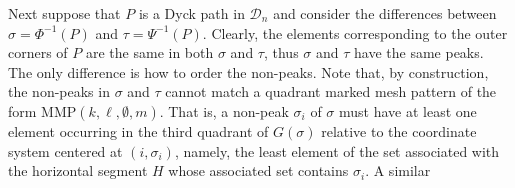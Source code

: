 \documentclass[
final,nomarks
]{dmtcs-episciences}
\newcommand{\MMP}{\mathrm{MMP}}
\begin{document}
Next suppose that \begin{math}P\end{math} is a Dyck path in \begin{math}\mathcal{D}_n\end{math} and consider the 
differences between \begin{math}\sigma = \Phi^{-1}(P)\end{math} and \begin{math}\tau =\Psi^{-1}(P)\end{math}. Clearly, the elements 
corresponding to the outer corners of \begin{math}P\end{math} are the same in both \begin{math}\sigma\end{math} and \begin{math}\tau\end{math}, thus \begin{math}\sigma\end{math} and \begin{math}\tau\end{math} have the same peaks. The only 
difference is how to order the non-peaks. Note that, by construction, 
the non-peaks in \begin{math}\sigma\end{math} and \begin{math}\tau\end{math} cannot match a quadrant marked mesh 
pattern of the form \begin{math}\MMP(k,\ell,\emptyset,m)\end{math}. That is, 
a non-peak \begin{math}\sigma_i\end{math} of \begin{math}\sigma\end{math} must have at least one element occurring in 
the third quadrant of \begin{math}G(\sigma)\end{math} relative to the coordinate system centered 
at \begin{math}(i,\sigma_i)\end{math}, namely, the least element of the set associated 
with the horizontal segment \begin{math}H\end{math} whose associated set contains \begin{math}\sigma_i\end{math}. A similar 
\end{document}
